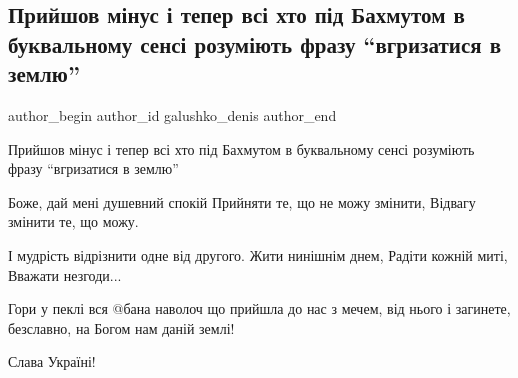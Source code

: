  
 
 
 
 
 
\subsection{Прийшов мінус і тепер всі хто під Бахмутом в буквальному сенсі розуміють фразу \enquote{вгризатися в землю}}
\label{sec:08_01_2023.fb.galushko_denis.1.bahmut_prijshov_minus}
 
\ifcmt
 author_begin
   author_id galushko_denis
 author_end
\fi

Прийшов мінус і тепер всі хто під Бахмутом в буквальному сенсі розуміють фразу
\enquote{вгризатися в землю}

Боже, дай мені душевний спокій  Прийняти те, що не можу змінити, Відвагу
змінити те, що можу.

І мудрість відрізнити одне від другого. Жити нинішнім днем, Радіти кожній миті,
Вважати незгоди...

Гори у пеклі вся @бана наволоч що прийшла до нас з мечем, від нього і загинете,
безславно, на Богом нам даній землі!

Слава Україні!
